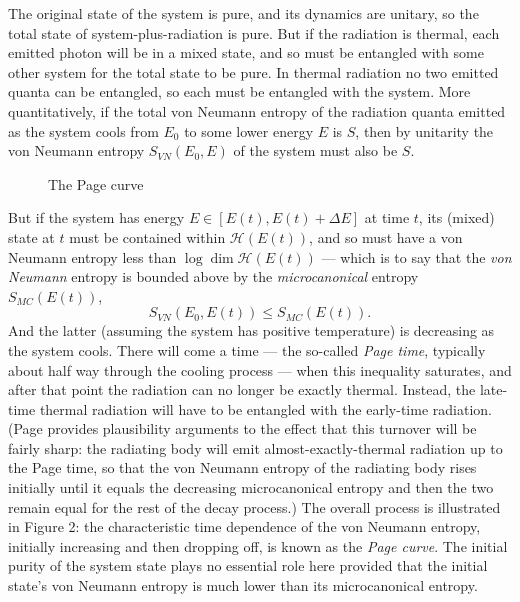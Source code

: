 \documentclass{article}
\newcommand{\mc}[1]{\ensuremath{\mathcal{#1}}}
\newcommand{\be}{\begin{equation}}
\newcommand{\ee}{\end{equation}}
\begin{document}
The original state of the system is pure, and its dynamics are unitary, so the total state of system-plus-radiation is pure. But if the radiation is thermal, each emitted photon will be in a mixed state, and so must be entangled with some other system for the total state to be pure. In thermal radiation no two emitted quanta can be entangled, so each must be entangled with the system. More quantitatively, if the total von Neumann entropy of the  radiation quanta emitted as the system cools from $E_0$ to some lower energy $E$ is $S$, then by unitarity the von Neumann entropy $S_{VN}(E_0,E)$ of the system must also be $S$. 
\begin{figure}
\caption{The Page curve}
\end{figure}
But if the system has energy $E\in [E(t),E(t)+\Delta E]$ at time $t$, its (mixed) state at $t$ must be contained within $\mc{H}(E(t))$, and so must have a von Neumann entropy less than $\log \dim \mc{H}(E(t))$ --- which is to say that the \emph{von Neumann} entropy is bounded above by the \emph{microcanonical} entropy $S_{MC}(E(t))$,
\be
S_{VN}(E_0,E(t))\leq S_{MC}(E(t)).
\ee And the latter (assuming the system has positive temperature) is decreasing as the system cools. There will come a time --- the so-called \emph{Page time}, typically about half way through the cooling process --- when this inequality saturates, and after that point the radiation can no longer be exactly thermal. Instead, the late-time thermal radiation will have to be entangled with the early-time radiation. (Page provides plausibility arguments to the effect that this turnover will be fairly sharp: the radiating body will emit almost-exactly-thermal radiation up to the Page time, so that the von Neumann entropy of the radiating body rises initially until it equals the decreasing microcanonical entropy and then the two remain equal for the rest of the decay process.) The overall process is illustrated in Figure 2: the characteristic time dependence of the von Neumann entropy, initially increasing and then dropping off, is known as the \emph{Page curve}. The initial purity of the system state plays no essential role here provided that the initial state's von Neumann entropy is much lower than its microcanonical entropy. 
\end{document}
